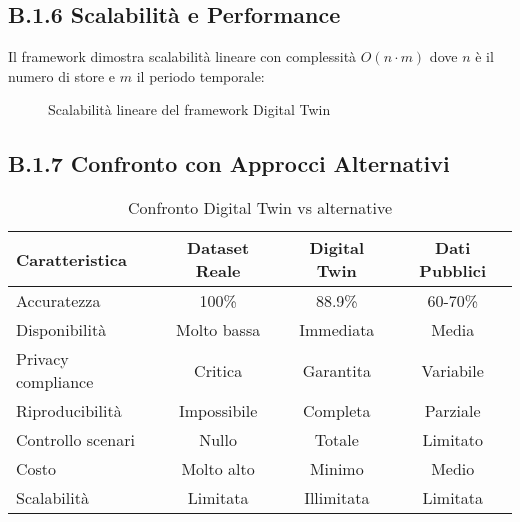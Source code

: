 \subsection{B.1.6 Scalabilità e Performance}

Il framework dimostra scalabilità lineare con complessità $O(n \cdot m)$ dove $n$ è il numero di store e $m$ il periodo temporale:

\begin{figure}[h]
\centering
{}
\caption{Scalabilità lineare del framework Digital Twin}
\label{fig:scalability}
\end{figure}

\subsection{B.1.7 Confronto con Approcci Alternativi}

\begin{table}[h]
\centering
\caption{Confronto Digital Twin vs alternative}
\label{tab:comparison}
\begin{tabular}{@{}lccc@{}}
\toprule
\textbf{Caratteristica} & \textbf{Dataset Reale} & \textbf{Digital Twin} & \textbf{Dati Pubblici} \\
\midrule
Accuratezza & 100\% & 88.9\% & 60-70\% \\
Disponibilità & Molto bassa & Immediata & Media \\
Privacy compliance & Critica & Garantita & Variabile \\
Riproducibilità & Impossibile & Completa & Parziale \\
Controllo scenari & Nullo & Totale & Limitato \\
Costo & Molto alto & Minimo & Medio \\
Scalabilità & Limitata & Illimitata & Limitata \\
\bottomrule
\end{tabular}
\end{table}

